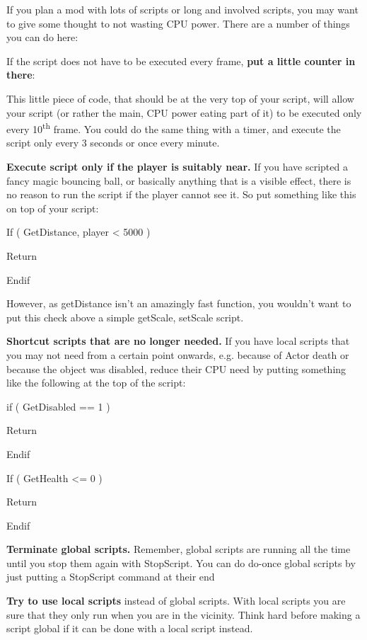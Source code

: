If you plan a mod with lots of scripts or long and involved scripts, you
may want to give some thought to not wasting CPU power. There are a
number of things you can do here:

If the script does not have to be executed every frame, \textbf{put a
little counter in there}:



This little piece of code, that should be at the very top of your
script, will allow your script (or rather the main, CPU power eating
part of it) to be executed only every 10\textsuperscript{th} frame. You
could do the same thing with a timer, and execute the script only every
3 seconds or once every minute.

\textbf{Execute script only if the player is suitably near.} If you have
scripted a fancy magic bouncing ball, or basically anything that is a
visible effect, there is no reason to run the script if the player
cannot see it. So put something like this on top of your script:

If ( GetDistance, player \textless{} 5000 )

Return

Endif

However, as getDistance isn't an amazingly fast function, you wouldn't
want to put this check above a simple getScale, setScale script.

\textbf{Shortcut scripts that are no longer needed.} If you have local
scripts that you may not need from a certain point onwards, e.g. because
of Actor death or because the object was disabled, reduce their CPU need
by putting something like the following at the top of the script:

if ( GetDisabled == 1 )

Return

Endif

If ( GetHealth \textless= 0 )

Return

Endif

\textbf{Terminate global scripts.} Remember, global scripts are running
all the time until you stop them again with StopScript. You can do
do-once global scripts by just putting a StopScript command at their end



\textbf{Try to use local scripts} instead of global scripts. With local
scripts you are sure that they only run when you are in the vicinity.
Think hard before making a script global if it can be done with a local
script instead.

